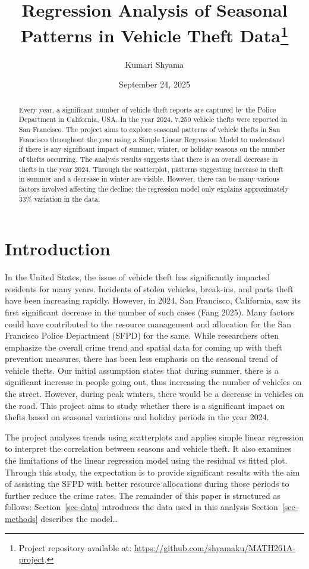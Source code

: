 \documentclass[
  letterpaper,
  DIV=11,
  numbers=noendperiod]{scrartcl}
\title{Regression Analysis of Seasonal Patterns in Vehicle Theft
Data\thanks{Project repository available at:
\url{https://github.com/shyamaku/MATH261A-project}.}}
\author{Kumari Shyama}
\date{September 24, 2025}
\begin{document}
\maketitle
\begin{abstract}
Every year, a significant number of vehicle theft reports are captured
by the Police Department in California, USA. In the year 2024, 7,250
vehicle thefts were reported in San Francisco. The project aims to
explore seasonal patterns of vehicle thefts in San Francisco throughout
the year using a Simple Linear Regression Model to understand if there
is any significant impact of summer, winter, or holiday seasons on the
number of thefts occurring. The analysis results suggests that there is
an overall decrease in thefts in the year 2024. Through the scatterplot,
patterns suggesting increase in theft in summer and a decrease in winter
are visible. However, there can be many various factors involved
affecting the decline; the regression model only explains approximately
33\% variation in the data.
\end{abstract}


\section{Introduction}\label{introduction}

In the United States, the issue of vehicle theft has significantly
impacted residents for many years. Incidents of stolen vehicles,
break-ins, and parts theft have been increasing rapidly. However, in
2024, San Francisco, California, saw its first significant decrease in
the number of such cases (Fang 2025). Many factors could have
contributed to the resource management and allocation for the San
Francisco Police Department (SFPD) for the same. While researchers often
emphasize the overall crime trend and spatial data for coming up with
theft prevention measures, there has been less emphasis on the seasonal
trend of vehicle thefts. Our initial assumption states that during
summer, there is a significant increase in people going out, thus
increasing the number of vehicles on the street. However, during peak
winters, there would be a decrease in vehicles on the road. This project
aims to study whether there is a significant impact on thefts based on
seasonal variations and holiday periods in the year 2024.

The project analyses trends using scatterplots and applies simple linear
regression to interpret the correlation between seasons and vehicle
theft. It also examines the limitations of the linear regression model
using the residual vs fitted plot. Through this study, the expectation
is to provide significant results with the aim of assisting the SFPD
with better resource allocations during those periods to further reduce
the crime rates. The remainder of this paper is structured as follows:
Section~\ref{sec-data} introduces the data used in this analysis
Section~\ref{sec-methods} describes the model\ldots{}
\end{document}
